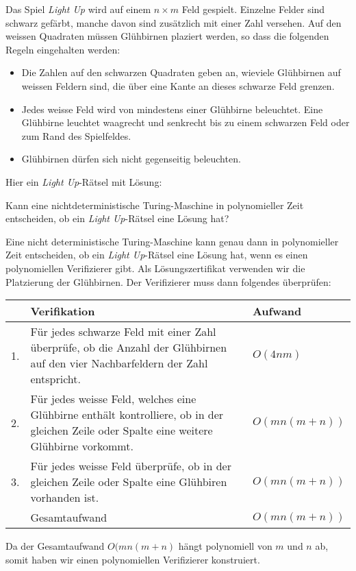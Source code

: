 Das Spiel {\em Light Up} wird auf einem $n\times m$ Feld gespielt.
Einzelne Felder sind schwarz gefärbt, manche davon sind zusätzlich
mit einer Zahl versehen.
Auf den weissen Quadraten müssen Glühbirnen plaziert werden,
so dass die folgenden Regeln eingehalten werden: 
\begin{itemize}
\item
Die Zahlen auf den schwarzen Quadraten geben an, wieviele Glühbirnen
auf weissen Feldern sind, die über eine Kante an dieses schwarze Feld grenzen. 
\item
Jedes weisse Feld wird von mindestens einer Glühbirne beleuchtet.
Eine Glühbirne leuchtet waagrecht und senkrecht bis zu einem schwarzen Feld
oder zum Rand des Spielfeldes. 
\item
Glühbirnen dürfen sich nicht gegenseitig beleuchten. 
\end{itemize}
Hier ein {\em Light Up}-Rätsel mit Lösung:
\begin{center}
\qquad
{}
\end{center}

Kann eine nichtdeterministische Turing-Maschine in polynomieller Zeit
entscheiden, ob ein {\em Light Up}-Rätsel eine Lösung hat?


\begin{loesung}
Eine nicht deterministische Turing-Maschine kann genau dann in polynomieller
Zeit entscheiden, ob ein {\em Light Up}-Rätsel eine Lösung hat,
wenn es einen polynomiellen Verifizierer gibt.
Als Lösungszertifikat verwenden wir die Platzierung der Glühbirnen.
Der Verifizierer muss dann folgendes überprüfen:
\begin{center}
\begin{tabular}{rll}
  &Verifikation&Aufwand\\
\hline
1.&\begin{minipage}[t]{12cm}\strut
Für jedes schwarze Feld mit einer Zahl überprüfe, ob die Anzahl
der Glühbirnen auf den vier Nachbarfeldern der Zahl entspricht.
\strut\end{minipage}&$O(4nm)$\\
2.&\begin{minipage}[t]{12cm}\strut
Für jedes weisse Feld, welches eine Glühbirne enthält kontrolliere,
ob in der gleichen Zeile oder Spalte eine weitere Glühbirne vorkommt.
\strut\end{minipage}&$O(mn(m+n))$\\
3.&\begin{minipage}[t]{12cm}\strut
Für jedes weisse Feld überprüfe, ob in der gleichen Zeile oder
Spalte eine Glühbiren vorhanden ist.
\strut\end{minipage}&$O(mn(m+n))$\\
\hline
&Gesamtaufwand&$O(mn(m+n))$
\end{tabular}
\end{center}
Da der Gesamtaufwand $O(mn(m+n)$ hängt polynomiell von $m$ und $n$
ab, somit haben wir einen polynomiellen Verifizierer konstruiert.
\end{loesung}

